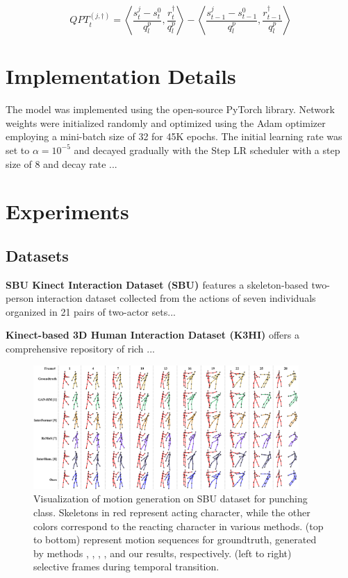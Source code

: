\begin{equation}
	\label{eq1}
	{QPT}_t^{(j,\dagger)} = \left\langle {\frac{ s_t^j - s_t^0}{{q_l^p}} }, \frac{{r_t^\dagger}}{{q_l^p}} \right\rangle  - \left\langle \frac{{s_{t-1}^j - s_{t-1}^0}}{{q_l^p}}, \frac{{r_{t-1}^\dagger}}{{q_l^p}} \right\rangle
\end{equation}





\section{Implementation Details}
\label{implementation}
The model was implemented using the open-source PyTorch library. Network weights were initialized randomly and optimized using the Adam optimizer employing a mini-batch size of 32 for 45K epochs. The initial learning rate was set to $ \alpha=10^{-5} $ and decayed gradually with the Step LR scheduler with a step size of 8 and decay rate ...


\section{Experiments}
\label{exp_res}

\subsection{Datasets}
\label{datasets}

\noindent
\textbf{SBU Kinect Interaction Dataset (SBU) \cite{sbu_dataset}} features a skeleton-based two-person interaction dataset collected from the actions of seven individuals organized in 21 pairs of two-actor sets...

\noindent
\textbf{Kinect-based 3D Human Interaction Dataset (K3HI)\cite{k3hi_dataset}} offers a comprehensive repository of rich ...



\begin{figure}	
	\centering
	\includegraphics[width=0.9\textwidth]{figures/chapter4/fig_results_sbu}
	\caption{Visualization of motion generation on SBU dataset for punching class. Skeletons in red represent acting character, while the other colors correspond to the reacting character in various methods. (top to bottom) represent motion sequences for groundtruth, generated by methods \cite{gan-reaction-motion}, \cite{interaction_transformer}, \cite{remos}, \cite{interaction-humanoid}, and our results, respectively. (left to right) selective frames during temporal transition.}
	\label{fig_results_sbu}
\end{figure}



